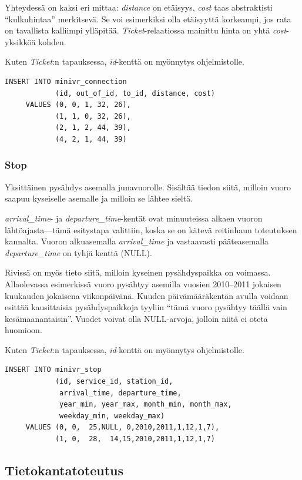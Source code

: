 \documentclass[a4paper,twoside,titlepage,12pt]{article}
\begin{document}
Yhteydessä on kaksi eri mittaa: \emph{distance} on etäisyys, \emph{cost} taas
abstraktisti ``kulkuhintaa'' merkitsevä. Se voi esimerkiksi olla etäisyyttä
korkeampi, jos rata on tavallista kalliimpi ylläpitää.
\emph{Ticket}-relaatiossa mainittu hinta on yhtä \emph{cost}-yksikköä kohden.

Kuten \emph{Ticket}:n tapauksessa, \emph{id}-kenttä on myönnytys ohjelmistolle.

\begin{lstlisting}
INSERT INTO minivr_connection
            (id, out_of_id, to_id, distance, cost)
     VALUES (0, 0, 1, 32, 26),
            (1, 1, 0, 32, 26),
            (2, 1, 2, 44, 39),
            (4, 2, 1, 44, 39)
\end{lstlisting}

\subsubsection{Stop}

Yksittäinen pysähdys asemalla junavuorolle. Sisältää tiedon siitä, milloin
vuoro saapuu kyseiselle asemalle ja milloin se lähtee sieltä.

\emph{arrival\_time}- ja \emph{departure\_time}-kentät ovat minuuteissa alkaen
vuoron lähtöajasta---tämä esitystapa valittiin, koska se on kätevä reitinhaun
toteutuksen kannalta. Vuoron alkuasemalla \emph{arrival\_time} ja vastaavasti
pääteasemalla \emph{departure\_time} on tyhjä kenttä (NULL).

Rivissä on myös tieto siitä, milloin kyseinen pysähdyspaikka on voimassa.
Allaolevassa esimerkissä vuoro pysähtyy asemilla vuosien 2010--2011 jokaisen
kuukauden jokaisena viikonpäivänä. Kuuden päivämääräkentän avulla voidaan
esittää kausittaisia pysähdyspaikkoja tyyliin ``tämä vuoro pysähtyy täällä vain
kesämaanantaisin''. Vuodet voivat olla NULL-arvoja, jolloin niitä ei oteta
huomioon.

Kuten \emph{Ticket}:n tapauksessa, \emph{id}-kenttä on myönnytys ohjelmistolle.

\begin{lstlisting}
INSERT INTO minivr_stop
            (id, service_id, station_id,
             arrival_time, departure_time,
             year_min, year_max, month_min, month_max,
             weekday_min, weekday_max)
     VALUES (0, 0,  25,NULL, 0,2010,2011,1,12,1,7),
            (1, 0,  28,  14,15,2010,2011,1,12,1,7)
\end{lstlisting}

\subsection{Tietokantatoteutus}
\end{document}
